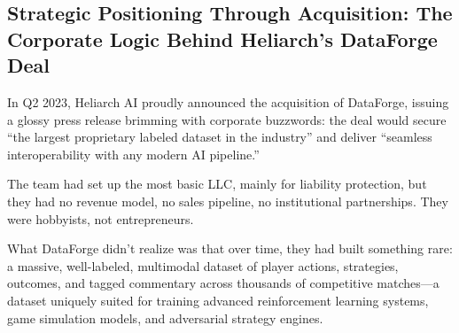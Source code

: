 \subsection{Strategic Positioning Through Acquisition: The Corporate Logic Behind Heliarch’s DataForge Deal}

In Q2 2023, Heliarch AI proudly announced the acquisition of DataForge, issuing a glossy press release brimming with corporate buzzwords:
the deal would secure “the largest proprietary labeled dataset in the industry” and deliver “seamless interoperability with any modern AI pipeline.”

The team had set up the most basic LLC, mainly for liability protection, but they had no revenue model, no sales pipeline, no institutional partnerships. They were hobbyists, not entrepreneurs.

What DataForge didn’t realize was that over time, they had built something rare:
a massive, well-labeled, multimodal dataset of player actions, strategies, outcomes, and tagged commentary across thousands of competitive matches—a dataset uniquely suited for training advanced reinforcement learning systems, game simulation models, and adversarial strategy engines.


